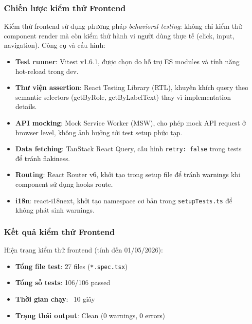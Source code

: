 \subsubsection{Chiến lược kiểm thử Frontend}
Kiểm thử frontend sử dụng phương pháp \textit{behavioral testing}: không chỉ kiểm thử component render mà còn kiểm thử hành vi người dùng thực tế (click, input, navigation). Công cụ và cấu hình:
\begin{itemize}
	\item \textbf{Test runner}: Vitest v1.6.1, được chọn do hỗ trợ ES modules và tính năng hot-reload trong dev.
	\item \textbf{Thư viện assertion}: React Testing Library (RTL), khuyến khích query theo semantic selectors (getByRole, getByLabelText) thay vì implementation details.
	\item \textbf{API mocking}: Mock Service Worker (MSW), cho phép mock API request ở browser level, không ảnh hưởng tới test setup phức tạp.
	\item \textbf{Data fetching}: TanStack React Query, cấu hình \texttt{retry: false} trong tests để tránh flakiness.
	\item \textbf{Routing}: React Router v6, khởi tạo trong setup file để tránh warnings khi component sử dụng hooks route.
	\item \textbf{i18n}: react-i18next, khởi tạo namespace cơ bản trong \texttt{setupTests.ts} để không phát sinh warnings.
\end{itemize}

\subsubsection{Kết quả kiểm thử Frontend}
Hiện trạng kiểm thử frontend (tính đến 01/05/2026):
\begin{itemize}
	\item \textbf{Tổng file test}: 27 files (\texttt{*.spec.tsx})
	\item \textbf{Tổng số tests}: 106/106 passed
	\item \textbf{Thời gian chạy}: ~10 giây
	\item \textbf{Trạng thái output}: Clean (0 warnings, 0 errors)
\end{itemize}

